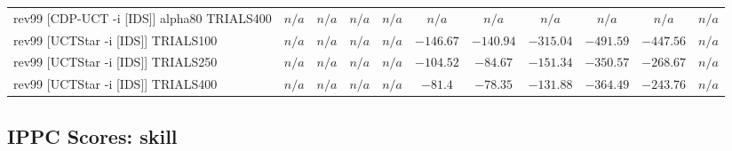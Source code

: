 \documentclass{article}
\begin{document}
\begin{tabular}{|l|r@{$\pm$}rr@{$\pm$}rr@{$\pm$}rr@{$\pm$}rr@{$\pm$}rr@{$\pm$}rr@{$\pm$}rr@{$\pm$}rr@{$\pm$}rr@{$\pm$}r|}
\\
rev99 [CDP-UCT -i [IDS]] alpha80 TRIALS400
& \multicolumn{2}{c}{\textbf{$n/a$}}
& \multicolumn{2}{c}{\textbf{$n/a$}}
& \multicolumn{2}{c}{\textbf{$n/a$}}
& \multicolumn{2}{c}{\textbf{$n/a$}}
& \multicolumn{2}{c}{\textbf{$n/a$}}
& \multicolumn{2}{c}{\textbf{$n/a$}}
& \multicolumn{2}{c}{\textbf{$n/a$}}
& \multicolumn{2}{c}{\textbf{$n/a$}}
& \multicolumn{2}{c}{\textbf{$n/a$}}
& \multicolumn{2}{c|}{\textbf{$n/a$}}
\\
rev99 [UCTStar -i [IDS]] TRIALS100
& \multicolumn{2}{c}{\textbf{$n/a$}}
& \multicolumn{2}{c}{\textbf{$n/a$}}
& \multicolumn{2}{c}{\textbf{$n/a$}}
& \multicolumn{2}{c}{\textbf{$n/a$}}
& \multicolumn{2}{c}{$-146.67$}
& \multicolumn{2}{c}{$-140.94$}
& \multicolumn{2}{c}{$-315.04$}
& \multicolumn{2}{c}{$-491.59$}
& \multicolumn{2}{c}{$-447.56$}
& \multicolumn{2}{c|}{\textbf{$n/a$}}
\\
rev99 [UCTStar -i [IDS]] TRIALS250
& \multicolumn{2}{c}{\textbf{$n/a$}}
& \multicolumn{2}{c}{\textbf{$n/a$}}
& \multicolumn{2}{c}{\textbf{$n/a$}}
& \multicolumn{2}{c}{\textbf{$n/a$}}
& \multicolumn{2}{c}{$-104.52$}
& \multicolumn{2}{c}{$-84.67$}
& \multicolumn{2}{c}{$-151.34$}
& \multicolumn{2}{c}{$-350.57$}
& \multicolumn{2}{c}{$-268.67$}
& \multicolumn{2}{c|}{\textbf{$n/a$}}
\\
rev99 [UCTStar -i [IDS]] TRIALS400
& \multicolumn{2}{c}{\textbf{$n/a$}}
& \multicolumn{2}{c}{\textbf{$n/a$}}
& \multicolumn{2}{c}{\textbf{$n/a$}}
& \multicolumn{2}{c}{\textbf{$n/a$}}
& \multicolumn{2}{c}{$-81.4$}
& \multicolumn{2}{c}{$-78.35$}
& \multicolumn{2}{c}{$-131.88$}
& \multicolumn{2}{c}{$-364.49$}
& \multicolumn{2}{c}{$-243.76$}
& \multicolumn{2}{c|}{\textbf{$n/a$}}
\\
\hline
\end{tabular}%

\bigskip

\subsection*{IPPC Scores: skill}
\end{document}
